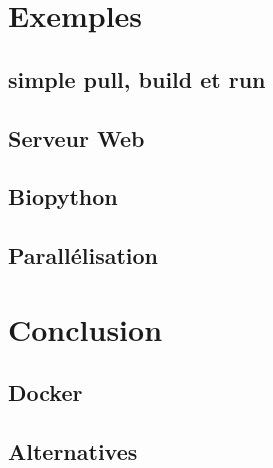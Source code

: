\section{Exemples}
\subsection{simple pull, build et run}
\subsection{Serveur Web}
\subsection{Biopython}
\subsection{Parallélisation}

\section{Conclusion}
\subsection{Docker}
\subsection{Alternatives}

































